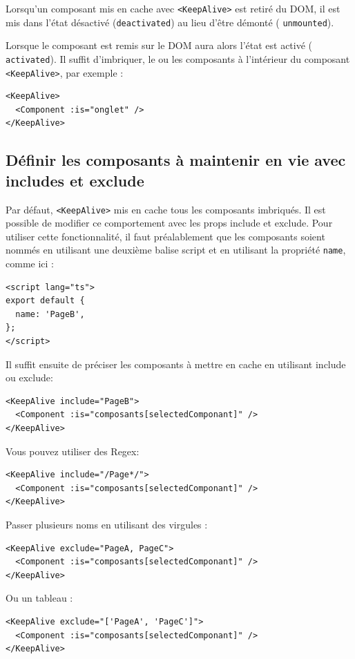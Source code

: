 Lorsqu'un composant mis en cache avec {\tt <KeepAlive>} est retiré du {\color{monOrange}DOM}, il est mis dans l'état désactivé ({\tt deactivated}) au lieu d'être démonté ( {\tt unmounted}).

Lorsque le composant est remis sur le {\color{monOrange}DOM} aura alors l'état est activé ( {\tt activated}). Il suffit d'imbriquer, le ou les composants à l'intérieur du composant {\tt <KeepAlive>}, par exemple :
\begin{verbatim}
<KeepAlive>
  <Component :is="onglet" />
</KeepAlive>
\end{verbatim}

\subsection{Définir les composants à maintenir en vie avec {\color{monOrange}includes} et {\color{monOrange}exclude}}
Par défaut, {\tt <KeepAlive>} mis en cache tous les composants imbriqués. Il est possible de modifier ce comportement avec les {\color{monOrange}props include} et {\color{monOrange}exclude}. Pour utiliser cette fonctionnalité, il faut préalablement que les composants soient nommés en utilisant une deuxième balise {\color{monOrange}script} et en utilisant la propriété {\tt name}, comme ici :
\begin{verbatim}
<script lang="ts">
export default {
  name: 'PageB',
};
</script>
\end{verbatim}
Il suffit ensuite de préciser les composants à mettre en cache en utilisant {\color{monOrange}include} ou {\color{monOrange}exclude}:
\begin{verbatim}
<KeepAlive include="PageB">
  <Component :is="composants[selectedComponant]" />
</KeepAlive>
\end{verbatim}
Vous pouvez utiliser des {\color{monOrange}Regex}:
\begin{verbatim}
<KeepAlive include="/Page*/">
  <Component :is="composants[selectedComponant]" />
</KeepAlive>
\end{verbatim}
Passer plusieurs noms en utilisant des virgules :
\begin{verbatim}
<KeepAlive exclude="PageA, PageC">
  <Component :is="composants[selectedComponant]" />
</KeepAlive>
\end{verbatim}
Ou un tableau :
\begin{verbatim}
<KeepAlive exclude="['PageA', 'PageC']">
  <Component :is="composants[selectedComponant]" />
</KeepAlive>
\end{verbatim}
